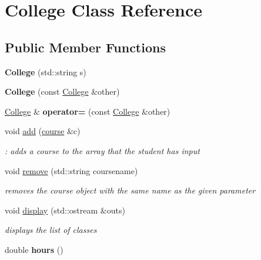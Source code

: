 \hypertarget{classCollege}{}\section{College Class Reference}
\label{classCollege}
\subsection*{Public Member Functions}
\begin{DoxyCompactItemize}
\item 
{\bfseries College} (std\+::string s)\hypertarget{classCollege_adabaf4087355e83f9f7d39f1e1498b41}{}\label{classCollege_adabaf4087355e83f9f7d39f1e1498b41}

\item 
{\bfseries College} (const \hyperlink{classCollege}{College} \&other)\hypertarget{classCollege_ad007ad488e5a7ef986114080d0c8e101}{}\label{classCollege_ad007ad488e5a7ef986114080d0c8e101}

\item 
\hyperlink{classCollege}{College} \& {\bfseries operator=} (const \hyperlink{classCollege}{College} \&other)\hypertarget{classCollege_af2194c9b37f80d13dc3fdba6784b18e8}{}\label{classCollege_af2194c9b37f80d13dc3fdba6784b18e8}

\item 
void \hyperlink{classCollege_a67fd1d8970b46b24ce2e0dd72598a22f}{add} (\hyperlink{classcourse}{course} \&c)
\begin{DoxyCompactList}\small\item\em \+: adds a course to the array that the student has input \end{DoxyCompactList}\item 
void \hyperlink{classCollege_a4d2ae513b36e6421fb1ca2c08459cfe6}{remove} (std\+::string coursename)
\begin{DoxyCompactList}\small\item\em removes the course object with the same name as the given parameter \end{DoxyCompactList}\item 
void \hyperlink{classCollege_a52ca0a164483cf5c05591cd0fb8b300c}{display} (std\+::ostream \&outs)
\begin{DoxyCompactList}\small\item\em displays the list of classes \end{DoxyCompactList}\item 
double {\bfseries hours} ()\hypertarget{classCollege_a8a7a762611a1d7e00c453390d49355fd}{}\label{classCollege_a8a7a762611a1d7e00c453390d49355fd}


\end{DoxyCompactItemize}
